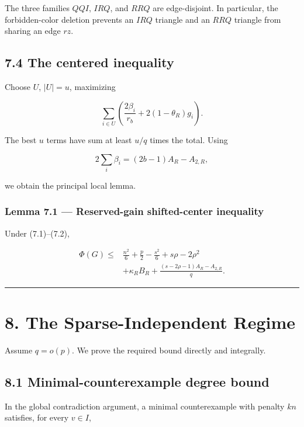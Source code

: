 \documentclass[
  11pt,
]{article}
\begin{document}
The three families \(QQI\), \(IRQ\), and \(RRQ\) are edge-disjoint. In particular, the forbidden-color deletion prevents an \(IRQ\) triangle and an \(RRQ\) triangle from sharing an edge \(rz\).

\subsection{7.4 The centered inequality}\label{the-centered-inequality}

Choose \(U\), \(|U|=u\), maximizing

\[
\sum_{i\in U}
\left(
\frac{2\beta_i}{r_b}+2(1-\theta_R)g_i
\right).
\]

The best \(u\) terms have sum at least \(u/q\) times the total. Using

\[
2\sum_i\beta_i
=(2b-1)A_R-A_{2,R},
\]

we obtain the principal local lemma.

\subsubsection{Lemma 7.1 --- Reserved-gain shifted-center inequality}\label{lemma-7.1-reserved-gain-shifted-center-inequality}

Under (7.1)--(7.2),

\[
\boxed{
\begin{aligned}
\Phi(G)
\le{}&
\frac{n^2}{6}+\frac p2-\frac{s^2}{6}
+s\rho-2\rho^2\\
&+
\kappa_RB_R
+
\frac{(s-2\rho-1)A_R-A_{2,R}}q.
\end{aligned}
}
\tag{7.6}
\]

\begin{center}\rule{0.5\linewidth}{0.5pt}\end{center}

\section{8. The Sparse-Independent Regime}\label{the-sparse-independent-regime}

Assume \(q=o(p)\). We prove the required bound directly and integrally.

\subsection{8.1 Minimal-counterexample degree bound}\label{minimal-counterexample-degree-bound}

In the global contradiction argument, a minimal counterexample with penalty \(kn\) satisfies, for every \(v\in I\),
\end{document}

